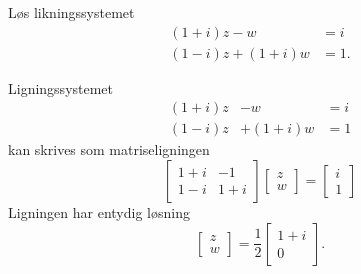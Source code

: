 
\begin{oppgave}
Løs likningssystemet
\begin{align*}
(1+i) z - w   &= i \\
(1-i) z + (1+i) w &= 1.
\end{align*}
\end{oppgave}

\begin{losning}
Ligningssystemet 
\begin{equation*}
\begin{matrix}
(1+i)z &- w &= i \\
(1-i)z &+ (1+i)w &= 1
\end{matrix}
\end{equation*}
kan skrives som matriseligningen
\begin{equation*}
\begin{bmatrix}	
1+i & -1 \\
1-i & 1+i
\end{bmatrix}
\begin{bmatrix}
z \\ w
\end{bmatrix}	
=
\begin{bmatrix}
i \\ 1
\end{bmatrix}
\end{equation*}
Ligningen har entydig løsning
\begin{equation*}
\begin{bmatrix}
z \\ w
\end{bmatrix}
=
\frac{1}{2}
\begin{bmatrix}
1 + i \\ 0
\end{bmatrix}.
\end{equation*}

\end{losning}


